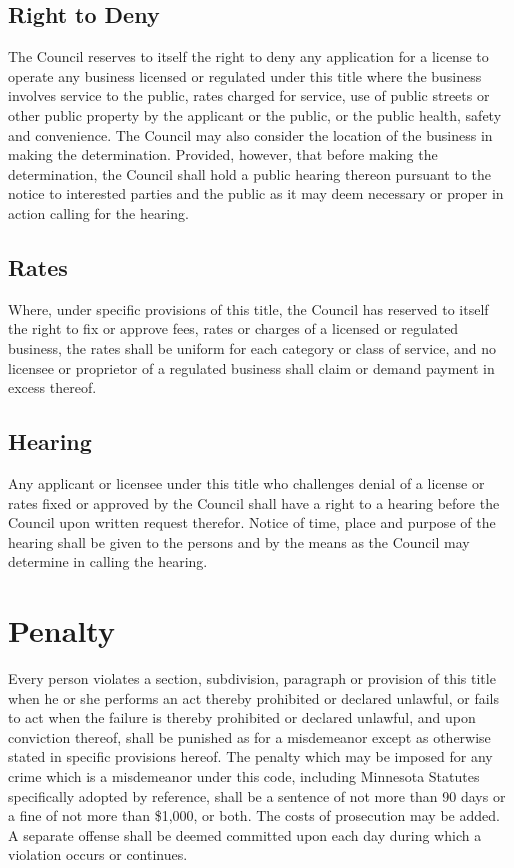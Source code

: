 \subsection{Right to Deny}
The Council reserves to itself the right to deny any application for a license to operate any business licensed or regulated under this title where the business involves service to the public, rates charged for service, use of public streets or other public property by the applicant or the public, or the public health, safety and convenience.  The Council may also consider the location of the business in making the determination.  Provided, however, that before making the determination, the Council shall hold a public hearing thereon pursuant to the notice to interested parties and the public as it may deem necessary or proper in action calling for the hearing.
\subsection{Rates}
Where, under specific provisions of this title, the Council has reserved to itself the right to fix or approve fees, rates or charges of a licensed or regulated business, the rates shall be uniform for each category or class of service, and no licensee or proprietor of a regulated business shall claim or demand payment in excess thereof.
\subsection{Hearing}
Any applicant or licensee under this title who challenges denial of a license or rates fixed or approved by the Council shall have a right to a hearing before the Council upon written request therefor.  Notice of time, place and purpose of the hearing shall be given to the persons and by the means as the Council may determine in calling the hearing.

\setcounter{section}{98}
\section{Penalty}
Every person violates a section, subdivision, paragraph or provision of this title when he or she performs an act thereby prohibited or declared unlawful, or fails to act when the failure is thereby prohibited or declared unlawful, and upon conviction thereof, shall be punished as for a misdemeanor except as otherwise stated in specific provisions hereof.  The penalty which may be imposed for any crime which is a misdemeanor under this code, including Minnesota Statutes specifically adopted by reference, shall be a sentence of not more than 90 days or a fine of not more than \$1,000, or both.  The costs of prosecution may be added.  A separate offense shall be deemed committed upon each day during which a violation occurs or continues.
